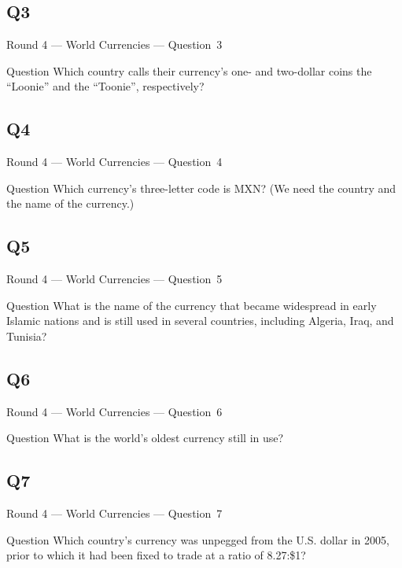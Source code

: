 \documentclass[11pt]{beamer}
\begin{document}
\subsection*{Q3}
\begin{frame}[t]{Round 4 --- World Currencies --- \mbox{Question 3}}
\vspace{-0.5em}
\begin{block}{Question}
Which country calls their currency's one- and two-dollar coins the ``Loonie'' and the ``Toonie'', respectively?
\end{block}
\end{frame}
\subsection*{Q4}
\begin{frame}[t]{Round 4 --- World Currencies --- \mbox{Question 4}}
\vspace{-0.5em}
\begin{block}{Question}
Which currency's three-letter code is MXN\@? (We need the country and the name of the currency.)
\end{block}
\end{frame}
\subsection*{Q5}
\begin{frame}[t]{Round 4 --- World Currencies --- \mbox{Question 5}}
\vspace{-0.5em}
\begin{block}{Question}
What is the name of the currency that became widespread in early Islamic nations and is still used in several countries, including Algeria, Iraq, and Tunisia?
\end{block}
\end{frame}
\subsection*{Q6}
\begin{frame}[t]{Round 4 --- World Currencies --- \mbox{Question 6}}
\vspace{-0.5em}
\begin{block}{Question}
What is the world's oldest currency still in use?
\end{block}
\end{frame}
\subsection*{Q7}
\begin{frame}[t]{Round 4 --- World Currencies --- \mbox{Question 7}}
\vspace{-0.5em}
\begin{block}{Question}
Which country's currency was unpegged from the U.S. dollar in 2005, prior to which it had been fixed to trade at a ratio of 8.27:\$1?
\end{block}
\end{frame}
\end{document}

